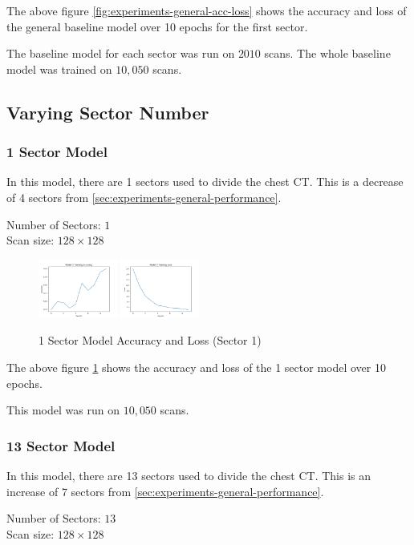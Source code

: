 \documentclass[10pt,twocolumn,letterpaper]{article}
\begin{document}
      The above figure \ref{fig:experiments-general-acc-loss} shows the accuracy and loss of the general baseline model over 10 epochs for the first sector.

      The baseline model for each sector was run on $2010$ scans. The whole baseline model was trained on $10,050$ scans.
   \subsection{Varying Sector Number} \label{sec:experiments-sector}
      \subsubsection{1 Sector Model} \label{sec:experiments-sector-13}
         In this model, there are 1 sectors used to divide the chest CT. This is a decrease of 4 sectors from \ref{sec:experiments-general-performance}.
         \begin{center}
            Number of Sectors: $1$ \\
            Scan size: $128 \times 128$
         \end{center}

         \begin{figure}[h]
            \centering
            \includegraphics[width=0.23\textwidth]{./images/training_accuracy_1_sector_128_px.png}
            \includegraphics[width=0.23\textwidth]{./images/training_loss_1_sector_128_px.png}
            \caption{1 Sector Model Accuracy and Loss (Sector 1)}
            \label{fig:experiments-1-sector-acc-loss}
         \end{figure}

         The above figure \ref{fig:experiments-1-sector-acc-loss} shows the accuracy and loss of the 1 sector model over 10 epochs.

         This model was run on $10,050$ scans.

      \subsubsection{13 Sector Model} \label{sec:experiments-sector-13}
         In this model, there are 13 sectors used to divide the chest CT. This is an increase of 7 sectors from \ref{sec:experiments-general-performance}.
         \begin{center}
            Number of Sectors: $13$ \\
            Scan size: $128 \times 128$
         \end{center}
\end{document}
